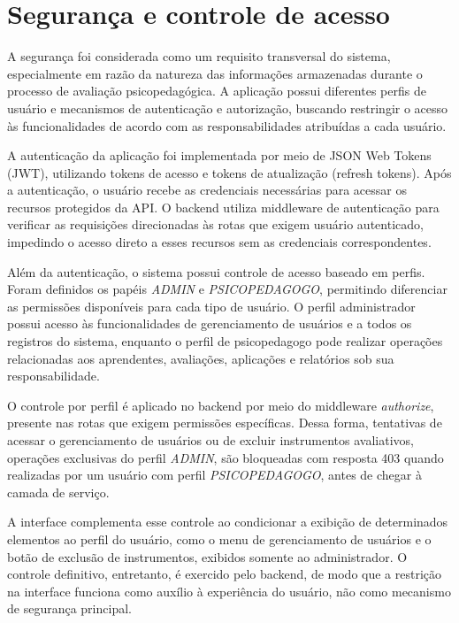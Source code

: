 \section{Segurança e controle de acesso}

A segurança foi considerada como um requisito transversal do sistema, especialmente em razão da natureza das informações armazenadas durante o processo de avaliação psicopedagógica. A aplicação possui diferentes perfis de usuário e mecanismos de autenticação e autorização, buscando restringir o acesso às funcionalidades de acordo com as responsabilidades atribuídas a cada usuário.

A autenticação da aplicação foi implementada por meio de JSON Web Tokens (JWT), utilizando tokens de acesso e tokens de atualização (refresh tokens). Após a autenticação, o usuário recebe as credenciais necessárias para acessar os recursos protegidos da API. O backend utiliza middleware de autenticação para verificar as requisições direcionadas às rotas que exigem usuário autenticado, impedindo o acesso direto a esses recursos sem as credenciais correspondentes.

Além da autenticação, o sistema possui controle de acesso baseado em perfis. Foram definidos os papéis \textit{ADMIN} e \textit{PSICOPEDAGOGO}, permitindo diferenciar as permissões disponíveis para cada tipo de usuário. O perfil administrador possui acesso às funcionalidades de gerenciamento de usuários e a todos os registros do sistema, enquanto o perfil de psicopedagogo pode realizar operações relacionadas aos aprendentes, avaliações, aplicações e relatórios sob sua responsabilidade.

O controle por perfil é aplicado no backend por meio do middleware \textit{authorize}, presente nas rotas que exigem permissões específicas. Dessa forma, tentativas de acessar o gerenciamento de usuários ou de excluir instrumentos avaliativos, operações exclusivas do perfil \textit{ADMIN}, são bloqueadas com resposta 403 quando realizadas por um usuário com perfil \textit{PSICOPEDAGOGO}, antes de chegar à camada de serviço. 

A interface complementa esse controle ao condicionar a exibição de determinados elementos ao perfil do usuário, como o menu de gerenciamento de usuários e o botão de exclusão de instrumentos, exibidos somente ao administrador. O controle definitivo, entretanto, é exercido pelo backend, de modo que a restrição na interface funciona como auxílio à experiência do usuário, não como mecanismo de segurança principal.

